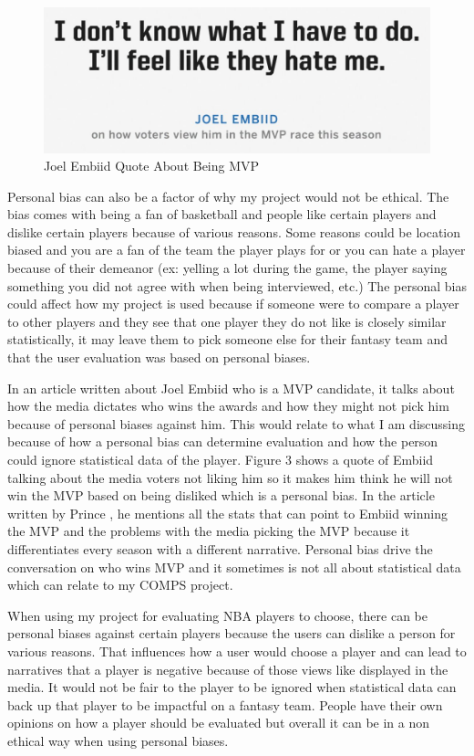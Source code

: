 \documentclass[10pt,twocolumn]{article}
\begin{document}
\begin{figure}
    \centering
    \includegraphics[width=.95\linewidth]{Joel_quote.png}
    \caption{
       Joel Embiid Quote About Being MVP
    }
    \label{fig:second-page}
\end{figure}
Personal bias can also be a factor of why my project would not be ethical. The bias comes with being a fan of basketball and people like certain players and dislike certain players because of various reasons. Some reasons could be location biased and you are a fan of the team the player plays for or you can hate a player because of their demeanor (ex: yelling a lot during the game, the player saying something you did not agree with when being interviewed, etc.) The personal bias could affect how my project is used because if someone were to compare a player to other players and they see that one player they do not like is closely similar statistically, it may leave them to pick someone else for their fantasy team and that the user evaluation was based on personal biases. 

In an article written about Joel Embiid who is a MVP candidate, it talks about how the media dictates who wins the awards and how they might not pick him because of personal biases against him. This would relate to what I am discussing because of how a personal bias can determine evaluation and how the person could ignore statistical data of the player. Figure 3 shows a quote of Embiid talking about the media voters not liking him so it makes him think he will not win the MVP based on being disliked which is a personal bias. In the article written by Prince \textcite{MVPBias}, he mentions all the stats that can point to Embiid winning the MVP and the problems with the media picking the MVP because it differentiates every season with a different narrative. Personal bias drive the conversation on who wins MVP and it sometimes is not all about statistical data which can relate to my COMPS project.

When using my project for evaluating NBA players to choose, there can be personal biases against certain players because the users can dislike a person for various reasons. That influences how a user would choose a player and can lead to narratives that a player is negative because of those views like displayed in the media. It would not be fair to the player to be ignored when statistical data can back up that player to be impactful on a fantasy team. People have their own opinions on how a player should be evaluated but overall it can be in a non ethical way when using personal biases.


\printbibliography 
\end{document}

